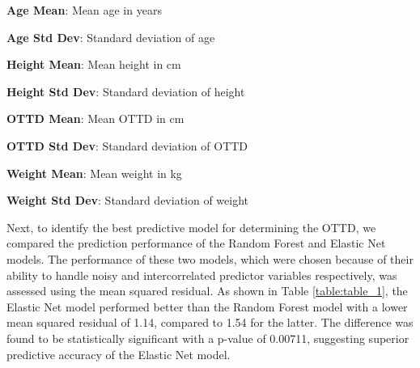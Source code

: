 \documentclass[11pt]{article}
\begin{document}
\begin{table}[h]
\caption{Descriptive statistics of age, height, weight, and OTTD, stratified by sex}
\label{table:table_0}
\begin{threeparttable}
\renewcommand{\TPTminimum}{\linewidth}
\begin{tablenotes}
\footnotesize
\item \textbf{Age Mean}: Mean age in years
\item \textbf{Age Std Dev}: Standard deviation of age
\item \textbf{Height Mean}: Mean height in cm
\item \textbf{Height Std Dev}: Standard deviation of height
\item \textbf{OTTD Mean}: Mean OTTD in cm
\item \textbf{OTTD Std Dev}: Standard deviation of OTTD
\item \textbf{Weight Mean}: Mean weight in kg
\item \textbf{Weight Std Dev}: Standard deviation of weight
\end{tablenotes}
\end{threeparttable}
\end{table}


Next, to identify the best predictive model for determining the OTTD, we compared the prediction performance of the Random Forest and Elastic Net models. The performance of these two models, which were chosen because of their ability to handle noisy and intercorrelated predictor variables respectively, was assessed using the mean squared residual. As shown in Table {}\ref{table:table_1}, the Elastic Net model performed better than the Random Forest model with a lower mean squared residual of 1.14, compared to 1.54 for the latter. The difference was found to be statistically significant with a p-value of 0.00711, suggesting superior predictive accuracy of the Elastic Net model.
\end{document}
